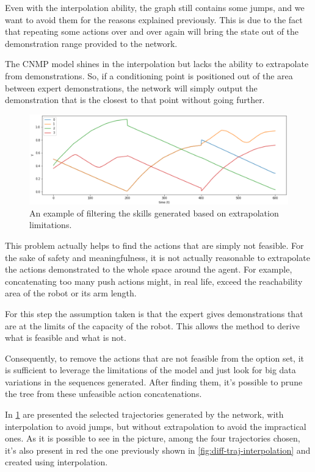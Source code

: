 Even with the interpolation ability, the graph still contains some jumps, and we want to avoid them for the reasons explained previously. This is due to the fact that repeating some actions over and over again will bring the state out of the demonstration range provided to the network. 

The CNMP model shines in the interpolation but lacks the ability to extrapolate from demonstrations. So, if a conditioning point is positioned out of the area between expert demonstrations, the network will simply output the demonstration that is the closest to that point without going further. 

\begin{figure}
    \centering
    \includegraphics[width=0.9\linewidth]{figures/diff-traj-filtered.png}
    \caption{ An example of filtering the skills generated based on extrapolation limitations. }
    \label{fig:diff-traj-filtered}
\end{figure}

This problem actually helps to find the actions that are simply not feasible. For the sake of safety and meaningfulness, it is not actually reasonable to extrapolate the actions demonstrated to the whole space around the agent. For example, concatenating too many push actions might, in real life, exceed the reachability area of the robot or its arm length. 

For this step the assumption taken is that the expert gives demonstrations that are at the limits of the capacity of the robot. This allows the method to derive what is feasible and what is not. 

Consequently, to remove the actions that are not feasible from the option set, it is sufficient to leverage the limitations of the model and just look for big data variations in the sequences generated. After finding them, it's possible to prune the tree from these unfeasible action concatenations.

In \cref{fig:diff-traj-filtered} are presented the selected trajectories generated by the network, with interpolation to avoid jumps, but without extrapolation to avoid the impractical ones. As it is possible to see in the picture, among the four trajectories chosen, it's also present in red the one previously shown in \cref{fig:diff-traj-interpolation} and created using interpolation.

